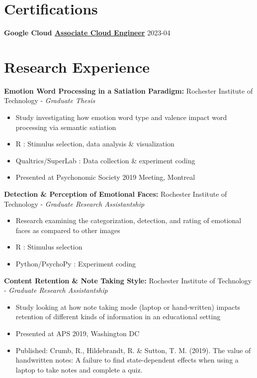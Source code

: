 \documentclass[a4paper,9pt]{extarticle}
\begin{document}
\section*{Certifications}

\noindent
\textbf{Google Cloud \href{https://google.accredible.com/d3ef369f-9c2c-486a-bda6-943a74f70dff}{Associate Cloud Engineer}} \hfill 2023-04

\section*{Research Experience}

\noindent
\textbf{Emotion Word Processing in a Satiation Paradigm:}
Rochester Institute of Technology - \textit{Graduate Thesis}
\begin{itemize}
\item Study investigating how emotion word type and valence impact word processing via semantic satiation
\item R : Stimulus selection, data analysis \& visualization
\item Qualtrics/SuperLab : Data collection \& experiment coding
\item Presented at Psychonomic Society 2019 Meeting, Montreal
\end{itemize}

\noindent
\textbf{Detection \& Perception of Emotional Faces:}
Rochester Institute of Technology - \textit{Graduate Research Assistantship}
\begin{itemize}
\item Research examining the categorization, detection, and rating of emotional faces as compared to other images
\item R : Stimulus selection
\item Python/PsychoPy : Experiment coding
\end{itemize}

\noindent
\textbf{Content Retention \& Note Taking Style:}
Rochester Institute of Technology - \textit{Graduate Research Assistantship}
\begin{itemize}
\item Study looking at how note taking mode (laptop or hand-written) impacts retention of different kinds of information in an educational setting
\item Presented at APS 2019, Washington DC
\item Published: Crumb, R., Hildebrandt, R. \& Sutton, T. M. (2019). The value of handwritten notes: A failure to find state-dependent effects when using a laptop to take notes and complete a quiz.
\end{itemize}
\end{document}
